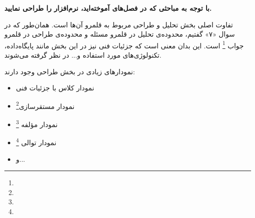 
\textbf{با توجه به مباحثی که در فصل‌های  آموخته‌اید، نرم‌افزار را طراحی نمایید.}

تفاوت اصلی بخش تحلیل و طراحی مربوط به قلمرو آن‌ها است. همان‌طور که در سوال «۷» گفتیم، محدوده‌ی تحلیل در قلمرو مسئله و محدوده‌ی طراحی در قلمرو جواب ‌\footnote{} است. این بدان معنی است که جزئیات فنی نیز در این بخش مانند پایگاه‌داده، تکنولوژی‌های مورد استفاده و... در نظر گرفته می‌شوند.

نمودارهای زیادی در بخش طراحی وجود دارند:
\begin{itemize}
	\item نمودار کلاس با جزئیات فنی
	\item نمودار مستقرسازی\footnote{}
	\item نمودار مؤلفه \footnote{}
	\item نمودار توالی \footnote{}
	\item و...
\end{itemize}

